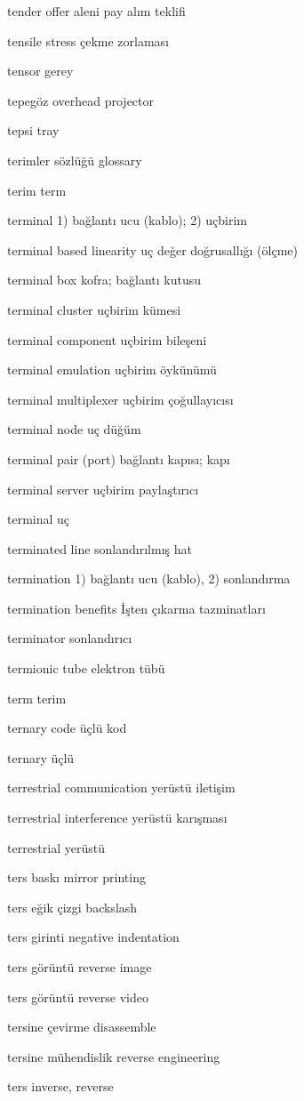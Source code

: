 \documentclass[12pt,fleqn]{article}\usepackage{../../common}
\begin{document}
tender offer aleni pay alım teklifi

tensile stress çekme zorlaması

tensor gerey

tepegöz overhead projector

tepsi tray

terimler sözlüğü glossary

terim term

terminal 1) bağlantı ucu (kablo); 2) uçbirim

terminal based linearity uç değer doğrusallığı (ölçme)

terminal box kofra; bağlantı kutusu

terminal cluster uçbirim kümesi

terminal component uçbirim bileşeni

terminal emulation uçbirim öykünümü

terminal multiplexer uçbirim çoğullayıcısı

terminal node uç düğüm

terminal pair (port) bağlantı kapısı; kapı

terminal server uçbirim paylaştırıcı

terminal uç

terminated line sonlandırılmış hat

termination 1) bağlantı ucu (kablo), 2) sonlandırma

termination benefits İşten çıkarma tazminatları

terminator sonlandırıcı

termionic tube elektron tübü

term terim

ternary code üçlü kod

ternary üçlü

terrestrial communication yerüstü iletişim

terrestrial interference yerüstü karışması

terrestrial yerüstü

ters baskı mirror printing

ters eğik çizgi backslash

ters girinti negative indentation

ters görüntü reverse image

ters görüntü reverse video

tersine çevirme disassemble

tersine mühendislik reverse engineering

ters inverse, reverse
\end{document}
